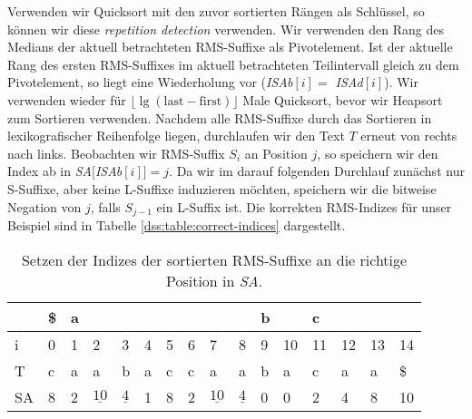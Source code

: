 Verwenden wir Quicksort mit den zuvor sortierten Rängen als Schlüssel, so können wir diese \textit{repetition detection} verwenden. Wir verwenden den Rang des Medians der aktuell betrachteten RMS-Suffixe als Pivotelement. Ist der aktuelle Rang des ersten RMS-Suffixes im aktuell betrachteten Teilintervall gleich zu dem Pivotelement, so liegt eine Wiederholung vor (\textit{ISAb$[i] = $ ISAd$[i]$}). Wir verwenden wieder für $\lfloor \lg (\text{last} - \text{first})\rfloor $ Male Quicksort, bevor wir Heapsort zum Sortieren verwenden. Nachdem alle RMS-Suffixe durch das Sortieren in lexikografischer Reihenfolge liegen, durchlaufen wir den Text $T$ erneut von rechts nach links. Beobachten wir RMS-Suffix $S_i$ an Position $j$, so speichern wir den Index ab in \textit{SA$[$ISAb$[i]] = j$}. Da wir im darauf folgenden Durchlauf zunächst nur S-Suffixe, aber keine L-Suffixe induzieren möchten, speichern wir die bitweise Negation von $j$, falls $S_{j-1}$ ein L-Suffix ist. Die korrekten RMS-Indizes für unser Beispiel sind in Tabelle \ref{dss:table:correct-indices} dargestellt.

\begin{table}
	\begin{tabular}{l|lllllllllllllll}
		& \multicolumn{1}{l|}{\$} & \multicolumn{8}{l|}{a}                                                                                                                                                                  & \multicolumn{2}{l|}{b} & \multicolumn{4}{l|}{c} \\ \hline
		i  & 0                       & 1 & 2                & 3               & 4 & 5                         & 6                         & 7                                        & 8                                       & 9         & 10        & 11   & 12  & 13  & 14  \\ \hline
		T  & c                       & a & a                & b               & a & c                         & c                         & a                                        & a                                       & b         & a         & c    & a   & a   & \$  \\ \hline
		SA & 8                       & 2 & $\underline{10}$ & $\underline{4}$ & 1 & \cellcolor[HTML]{32CB00}8 & \cellcolor[HTML]{32CB00}2 & \cellcolor[HTML]{32CB00}$\underline{10}$ & \cellcolor[HTML]{32CB00}$\underline{4}$ & 0         & 0         & 2    & 4   & 8   & 10  \\ \hline
	\end{tabular}
	\caption{Setzen der Indizes der sortierten RMS-Suffixe an die richtige Position in \textit{SA}.}
	\label{dss:table:final-sort}
\end{table}

